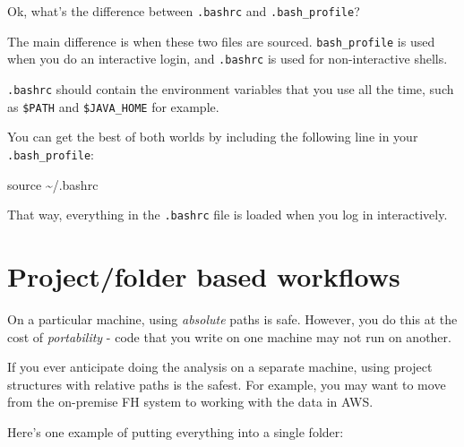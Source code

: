 \documentclass[
  letterpaper,
  DIV=11,
  numbers=noendperiod]{scrreprt}
\newenvironment{Shaded}{\begin{snugshade}}{\end{snugshade}}
\newcommand{\BuiltInTok}[1]{\textcolor[rgb]{0.00,0.23,0.31}{#1}}
\newcommand{\NormalTok}[1]{\textcolor[rgb]{0.00,0.23,0.31}{#1}}
\begin{document}
\begin{tcolorbox}[enhanced jigsaw, colbacktitle=quarto-callout-note-color!10!white, left=2mm, toprule=.15mm, toptitle=1mm, opacityback=0, bottomrule=.15mm, breakable, leftrule=.75mm, colframe=quarto-callout-note-color-frame, bottomtitle=1mm, titlerule=0mm, coltitle=black, title=\textcolor{quarto-callout-note-color}{\faInfo}\hspace{0.5em}{\texttt{.bashrc} versus \texttt{.bash\_profile}}, rightrule=.15mm, arc=.35mm, opacitybacktitle=0.6, colback=white]

Ok, what's the difference between \texttt{.bashrc} and
\texttt{.bash\_profile}?

The main difference is when these two files are sourced.
\texttt{bash\_profile} is used when you do an interactive login, and
\texttt{.bashrc} is used for non-interactive shells.

\texttt{.bashrc} should contain the environment variables that you use
all the time, such as \texttt{\$PATH} and \texttt{\$JAVA\_HOME} for
example.

You can get the best of both worlds by including the following line in
your \texttt{.bash\_profile}:

\begin{Shaded}
\begin{Highlighting}[]
\BuiltInTok{source}\NormalTok{ \textasciitilde{}/.bashrc}
\end{Highlighting}
\end{Shaded}

That way, everything in the \texttt{.bashrc} file is loaded when you log
in interactively.

\end{tcolorbox}

\section{Project/folder based workflows}\label{sec-project}

On a particular machine, using \emph{absolute} paths is safe. However,
you do this at the cost of \emph{portability} - code that you write on
one machine may not run on another.

If you ever anticipate doing the analysis on a separate machine, using
project structures with relative paths is the safest. For example, you
may want to move from the on-premise FH system to working with the data
in AWS.

Here's one example of putting everything into a single folder:
\end{document}
